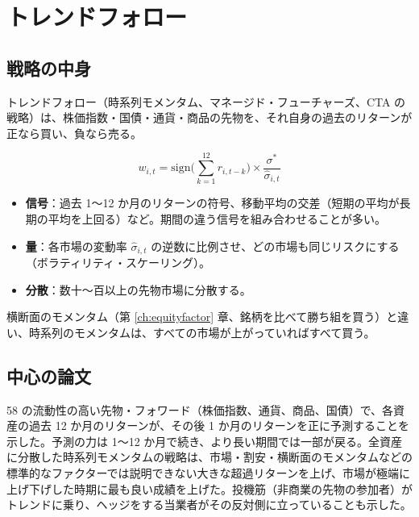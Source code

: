 \chapter{トレンドフォロー}
\label{ch:trend}

\section{戦略の中身}

トレンドフォロー（時系列モメンタム、マネージド・フューチャーズ、CTA の戦略）は、株価指数・国債・通貨・商品の先物を、それ自身の過去のリターンが正なら買い、負なら売る。

\begin{equation}
w_{i,t} = \mathrm{sign}\Big(\sum_{k=1}^{12} r_{i,t-k}\Big) \times \frac{\sigma^*}{\hat\sigma_{i,t}}
\end{equation}

\begin{itemize}
\item \textbf{信号}：過去 1〜12 か月のリターンの符号、移動平均の交差（短期の平均が長期の平均を上回る）など。期間の違う信号を組み合わせることが多い。
\item \textbf{量}：各市場の変動率 $\hat\sigma_{i,t}$ の逆数に比例させ、どの市場も同じリスクにする（ボラティリティ・スケーリング）。
\item \textbf{分散}：数十〜百以上の先物市場に分散する。
\end{itemize}

横断面のモメンタム（第 \ref{ch:equityfactor} 章、銘柄を比べて勝ち組を買う）と違い、時系列のモメンタムは、すべての市場が上がっていればすべて買う。

\section{中心の論文}

\begin{paperbox}
58 の流動性の高い先物・フォワード（株価指数、通貨、商品、国債）で、各資産の過去 12 か月のリターンが、その後 1 か月のリターンを正に予測することを示した。予測の力は 1〜12 か月で続き、より長い期間では一部が戻る。全資産に分散した時系列モメンタムの戦略は、市場・割安・横断面のモメンタムなどの標準的なファクターでは説明できない大きな超過リターンを上げ、市場が極端に上げ下げした時期に最も良い成績を上げた。投機筋（非商業の先物の参加者）がトレンドに乗り、ヘッジをする当業者がその反対側に立っていることも示した。
\end{paperbox}

